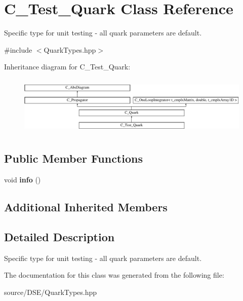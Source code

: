 \hypertarget{class_c___test___quark}{\section{C\-\_\-\-Test\-\_\-\-Quark Class Reference}
\label{class_c___test___quark}
}


Specific type for unit testing -\/ all quark parameters are default.  




{\ttfamily \#include $<$Quark\-Types.\-hpp$>$}

Inheritance diagram for C\-\_\-\-Test\-\_\-\-Quark\-:\begin{figure}[H]
\begin{center}
\leavevmode
\includegraphics[height=2.871795cm]{class_c___test___quark}
\end{center}
\end{figure}
\subsection*{Public Member Functions}
\begin{DoxyCompactItemize}
\item 
\hypertarget{class_c___test___quark_a34587b5c4031fe77c1b6c6c5c1c76a6a}{void {\bfseries info} ()}\label{class_c___test___quark_a34587b5c4031fe77c1b6c6c5c1c76a6a}

\end{DoxyCompactItemize}
\subsection*{Additional Inherited Members}


\subsection{Detailed Description}
Specific type for unit testing -\/ all quark parameters are default. 

The documentation for this class was generated from the following file\-:\begin{DoxyCompactItemize}
\item 
source/\-D\-S\-E/Quark\-Types.\-hpp\end{DoxyCompactItemize}
